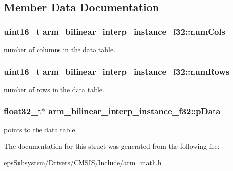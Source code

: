 \subsection{Member Data Documentation}
\hypertarget{structarm__bilinear__interp__instance__f32_aede17bebfb1f835b61d71dd813eab3f8}{
\subsubsection[{num\-Cols}]{\setlength{\rightskip}{0pt plus 5cm}uint16\-\_\-t arm\-\_\-bilinear\-\_\-interp\-\_\-instance\-\_\-f32\-::num\-Cols}}\label{structarm__bilinear__interp__instance__f32_aede17bebfb1f835b61d71dd813eab3f8}
number of columns in the data table. \hypertarget{structarm__bilinear__interp__instance__f32_a34f2b17cc57b95011960df9718af6ed6}{
\subsubsection[{num\-Rows}]{\setlength{\rightskip}{0pt plus 5cm}uint16\-\_\-t arm\-\_\-bilinear\-\_\-interp\-\_\-instance\-\_\-f32\-::num\-Rows}}\label{structarm__bilinear__interp__instance__f32_a34f2b17cc57b95011960df9718af6ed6}
number of rows in the data table. \hypertarget{structarm__bilinear__interp__instance__f32_afd1e764591c991c212d56c893efb5ea4}{
\subsubsection[{p\-Data}]{\setlength{\rightskip}{0pt plus 5cm}float32\-\_\-t$\ast$ arm\-\_\-bilinear\-\_\-interp\-\_\-instance\-\_\-f32\-::p\-Data}}\label{structarm__bilinear__interp__instance__f32_afd1e764591c991c212d56c893efb5ea4}
points to the data table. 

The documentation for this struct was generated from the following file\-:\begin{DoxyCompactItemize}
\item 
eps\-Subsystem/\-Drivers/\-C\-M\-S\-I\-S/\-Include/arm\-\_\-math.\-h\end{DoxyCompactItemize}
